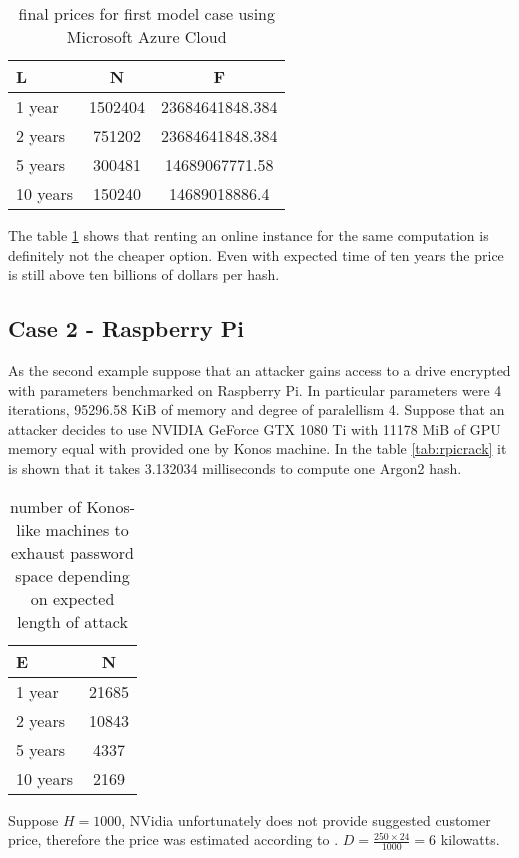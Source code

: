 \documentclass[nolof]{fithesis3}
\begin{document}
\noindent
\begin{table}
\caption{final prices for first model case using Microsoft Azure Cloud}
\label{tab:at3}
\begin{tabularx}{\textwidth}{| l | c | c |}
\hline
L & N & F\\
\hline
1 year & 1502404 & 23684641848.384\\
\hline
2 years & 751202 & 23684641848.384\\
\hline
5 years & 300481 & 14689067771.58\\
\hline
10 years & 150240 & 14689018886.4\\
\hline
\end{tabularx}
\end{table}

The table \ref{tab:at3} shows that renting an online instance for the same computation is definitely not the cheaper option. Even with expected time of ten years the price is still above ten billions of dollars per hash.

\subsection{Case 2 - Raspberry Pi}
As the second example suppose that an attacker gains access to a drive encrypted with parameters benchmarked on Raspberry Pi. In particular parameters were 4 iterations, 95296.58 KiB of memory and degree of paralellism 4. Suppose that an attacker decides to use NVIDIA GeForce GTX 1080 Ti with 11178 MiB of GPU memory equal with provided one by Konos machine. In the table \ref{tab:rpicrack} it is shown that it takes 3.132034 milliseconds to compute one Argon2 hash.

\noindent
\begin{table}
\caption{number of Konos-like machines to exhaust password space depending on expected length of attack}
\label{tab:at4}
\begin{tabularx}{\textwidth}{| l | c |}
\hline
E & N\\
\hline
1 year & 21685\\	
\hline
2 years & 10843\\
\hline
5 years & 4337\\
\hline
10 years & 2169\\
\hline
\end{tabularx}
\end{table}

Suppose $H = 1000$, NVidia unfortunately does not provide suggested customer price, therefore the price was estimated according to \parencite{geforceprice}. $D = \frac{250 \times 24}{1000} = 6$ kilowatts. 
\end{document}

